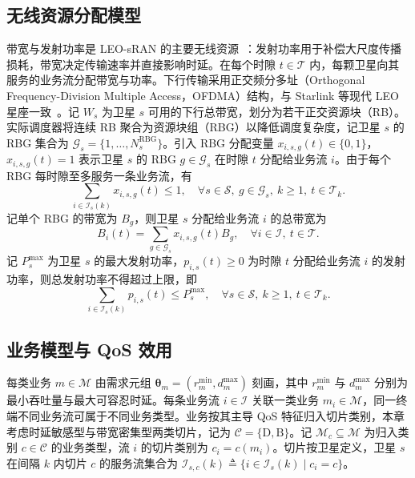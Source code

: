 \subsection{无线资源分配模型}
\label{subsec:ch4_radio}

带宽与发射功率是 LEO-sRAN 的主要无线资源~\cite{Balasingam-RANSlicing-NSDI24}：发射功率用于补偿大尺度传播损耗，带宽决定传输速率并直接影响时延。在每个时隙 $t\in\mathcal T$ 内，每颗卫星向其服务的业务流分配带宽与功率。下行传输采用正交频分多址（Orthogonal Frequency-Division Multiple Access，OFDMA）结构，与 Starlink 等现代 LEO 星座一致~\cite{neinavaie-StarlinkOFDM-TAES24}。记 $W_s$ 为卫星 $s$ 可用的下行总带宽，划分为若干正交资源块（RB）。实际调度器将连续 RB 聚合为资源块组（RBG）以降低调度复杂度，记卫星 $s$ 的 RBG 集合为 $\mathcal G_s=\{1,\dots,N_s^\text{RBG}\}$。引入 RBG 分配变量 $x_{i,s,g}(t)\in\{0,1\}$，$x_{i,s,g}(t)=1$ 表示卫星 $s$ 的 RBG $g\in\mathcal G_s$ 在时隙 $t$ 分配给业务流 $i$。由于每个 RBG 每时隙至多服务一条业务流，有
\begin{equation}\label{eq:ch4_rbg}
\sum_{i\in\mathcal I_s(k)}x_{i,s,g}(t)\le1,\quad \forall s\in\mathcal S,\ g\in\mathcal G_s,\ k\ge1,\ t\in\mathcal T_k.
\end{equation}
记单个 RBG 的带宽为 $B_g$，则卫星 $s$ 分配给业务流 $i$ 的总带宽为
\begin{equation}\label{eq:ch4_userbw}
B_i(t)=\sum_{g\in\mathcal G_s}x_{i,s,g}(t)B_g,\quad \forall i\in\mathcal I,\ t\in\mathcal T.
\end{equation}
记 $P_s^{\max}$ 为卫星 $s$ 的最大发射功率，$p_{i,s}(t)\ge0$ 为时隙 $t$ 分配给业务流 $i$ 的发射功率，则总发射功率不得超过上限，即
\begin{equation}\label{eq:ch4_power}
\sum_{i\in\mathcal I_s(k)}p_{i,s}(t)\le P_s^{\max},\quad \forall s\in\mathcal S,\ k\ge1,\ t\in\mathcal T_k.
\end{equation}

\subsection{业务模型与 QoS 效用}
\label{subsec:ch4_traffic}

每类业务 $m\in\mathcal M$ 由需求元组 $\boldsymbol\theta_m=(r_m^{\min},d_m^{\max})$ 刻画，其中 $r_m^{\min}$ 与 $d_m^{\max}$ 分别为最小吞吐量与最大可容忍时延。每条业务流 $i\in\mathcal I$ 关联一类业务 $m_i\in\mathcal M$，同一终端不同业务流可属于不同业务类型。业务按其主导 QoS 特征归入切片类别，本章考虑时延敏感型与带宽密集型两类切片，记为 $\mathcal C=\{\mathrm D,\mathrm B\}$。记 $\mathcal M_c\subseteq\mathcal M$ 为归入类别 $c\in\mathcal C$ 的业务类型，流 $i$ 的切片类别为 $c_i=c(m_i)$。切片按卫星定义，卫星 $s$ 在间隔 $k$ 内切片 $c$ 的服务流集合为 $\mathcal I_{s,c}(k)\triangleq\{i\in\mathcal I_s(k)\mid c_i=c\}$。

